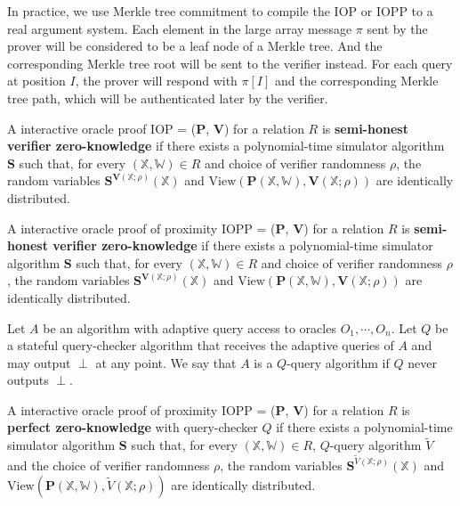 In practice, we use Merkle tree commitment to compile the IOP or IOPP to a real argument system. Each element in the large array message $\pi$ sent by the prover will be considered to be a leaf node of a Merkle tree. And the corresponding Merkle tree root will be sent to the verifier instead. For each query at position $I$, the prover will respond with $\pi[I]$ and the corresponding Merkle tree path, which will be authenticated later by the verifier.

\begin{definition}

A interactive oracle proof IOP = ($\textbf{P}$, $\textbf{V}$) for a relation $R$ is \textbf{semi-honest verifier zero-knowledge} if there exists a polynomial-time simulator algorithm $\textbf{S}$ such that, for every $(\mathbb{X}, \mathbb{W}) \in R$ and choice of verifier randomness $\rho$, the random variables $\textbf{S}^{\textbf{V}(\mathbb{X};\rho)}(\mathbb{X})$ and $\text{View}(\textbf{P}(\mathbb{X}, \mathbb{W}), \textbf{V}(\mathbb{X};\rho))$ are identically distributed.
 
\end{definition}

\begin{definition}

A interactive oracle proof of proximity IOPP = ($\textbf{P}$, $\textbf{V}$) for a relation $R$ is \textbf{semi-honest verifier zero-knowledge} if there exists a polynomial-time simulator algorithm $\textbf{S}$ such that, for every $(\mathbb{X}, \mathbb{W}) \in R$ and choice of verifier randomness $\rho$, the random variables $\textbf{S}^{\textbf{V}(\mathbb{X};\rho)}(\mathbb{X})$ and $\text{View}(\textbf{P}(\mathbb{X}, \mathbb{W}), \textbf{V}(\mathbb{X};\rho))$ are identically distributed.
 
\end{definition}

\begin{definition}

Let $A$ be an algorithm with adaptive query access to oracles $O_1, \cdots, O_n$. Let $Q$ be a stateful query-checker algorithm that receives the adaptive queries of $A$ and may output $\perp$ at any point. We say that $A$ is a $Q$-query algorithm if $Q$ never outputs $\perp$.
 
\end{definition}

\begin{definition}

A interactive oracle proof of proximity IOPP = ($\textbf{P}$, $\textbf{V}$) for a relation $R$ is \textbf{perfect zero-knowledge} with query-checker $Q$ if there exists a polynomial-time simulator algorithm $\textbf{S}$ such that, for every $(\mathbb{X}, \mathbb{W}) \in R$, 
$Q$-query algorithm $\widetilde{V}$ and the choice of verifier randomness $\rho$, the random variables $\textbf{S}^{\widetilde{V}(\mathbb{X};\rho)}(\mathbb{X})$ and $\text{View}(\textbf{P}(\mathbb{X}, \mathbb{W}), \widetilde{V}(\mathbb{X};\rho))$ are identically distributed.
 
\end{definition}

